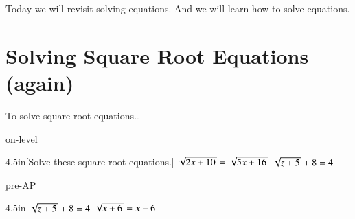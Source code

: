 Today we will revisit solving  equations.
And we will learn how to solve  equations.

\section{Solving Square Root Equations (again)}

\begin{myConceptSteps}{To solve square root equations\dots}
\end{myConceptSteps}

\begin{taggedblock}{on-level}
    \begin{my2Problems}[\large]{4.5in}[Solve these square root equations.]
        {
            $ \myRoot{2x+10} = \myRoot{5x+16} $
        }
        {
            $ \myRoot{z+5} + 8 = 4 $
        }
    \end{my2Problems}
\end{taggedblock}


\begin{taggedblock}{pre-AP}
    \begin{my2Problems}[\large]{4.5in}
        {
            $ \myRoot{z+5} + 8 = 4 $
        }
        {
            $ \myRoot{x+6}  = x-6 $
        }
    \end{my2Problems}
\end{taggedblock}
